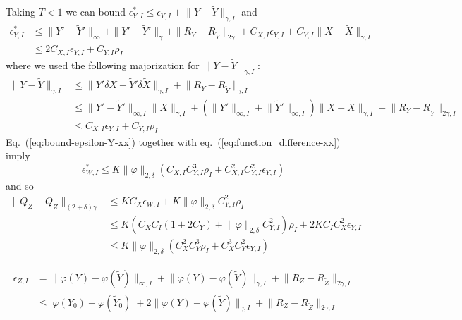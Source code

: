 \documentclass[a4paper,12pt,reqno]{amsproc}
\newcommand{\der}{\delta\!}
\newcommand{\norm}[1]{\lVert #1\rVert}
\newcommand{\wt}{\widetilde}
\begin{document}
Taking $T < 1$ we can bound $\epsilon^*_{Y,I} \le \epsilon_{Y,I} +
\norm{Y-\wt Y}_{\gamma,I}$ and
\begin{equation}
\label{eq:bound-epsilon-Y-xx}
  \begin{split}
\epsilon^*_{Y,I} & \le \|Y'-\widetilde Y'\|_\infty + \|Y'-\widetilde
Y'\|_{\gamma} +
\|R_Y-R_{\widetilde Y}\|_{2\gamma} + C_{X,I} \epsilon_{Y,I} + C_{Y,I}
\norm{X-\wt X}_{\gamma,I}
\\ & \le 2 C_{X,I} \epsilon_{Y,I} + C_{Y,I}
\rho_I
  \end{split}
\end{equation}
where we used the following majorization for $\norm{Y-\wt Y}_{\gamma,I}$:
\begin{equation}
  \label{eq:boundYgamma}
  \begin{split}
\norm{Y-\wt Y}_{\gamma,I} & \le \norm{Y'\der X-\wt
  Y' \der \wt X}_{\gamma,I} +\norm{R_Y-R_{\wt Y}}_{\gamma,I} 
  \\ & \le 
\norm{Y'-\wt
  Y'}_{\infty,I} \norm{X}_{\gamma,I} + (\norm{Y'}_{\infty,I}+\norm{\wt
  Y'}_{\infty,I}) \norm{X-\wt X}_{\gamma,I} + \norm{R_Y-R_{\wt Y}}_{2\gamma,I} 
  \\ & \le C_{X,I} \epsilon_{Y,I} + C_{Y,I} \rho_I
  \end{split}
\end{equation}
Eq.~(\ref{eq:bound-epsilon-Y-xx}) together with
eq.~(\ref{eq:function_difference-xx}) imply
\begin{equation*}
  \epsilon^*_{W,I} \le  K
 \norm{\varphi}_{2,\delta} (C_{X,I}
 C_{Y,I}^{3}  \rho_I + 
  C^2_{X,I}
 C_{Y,I}^{2} \epsilon_{Y,I}) 
\end{equation*}
and so
\begin{equation}
  \label{eq:boundQ2}
  \begin{split}
\norm{Q_Z- Q_{\wt Z}}_{(2+\delta)\gamma} & \le  K C_X \epsilon_{W,I} + K
  \norm{\varphi}_{2,\delta} C_{Y,I}^2 \rho_{I}
   \\ & \le
 K (C_X C_I (1+2 C_Y)+\norm{\varphi}_{2,\delta} C_{Y,I}^2) \rho_I + 2K C_I C^2_X \epsilon_{Y,I}
   \\ & \le K \norm{\varphi}_{2,\delta}(C_X^2 C_Y^3 \rho_I + C_X^3
  C_Y^2 \epsilon_{Y,I})
  \end{split}
\end{equation}

\begin{equation*}
  \begin{split}
\epsilon_{Z,I} & = \norm{\varphi(Y)-\varphi(\wt Y)}_{\infty,I} +
\norm{\varphi(Y)-\varphi(\wt Y)}_{\gamma,I} + \norm{R_Z-R_{\wt
    Z}}_{2\gamma,I}    
\\ & \le   |\varphi(Y_0)-\varphi(\wt Y_0)|+
2 \norm{\varphi(Y)-\varphi(\wt Y)}_{\gamma,I} + \norm{R_Z-R_{\wt
    Z}}_{2\gamma,I}
  \end{split}
\end{equation*}
\end{document}
